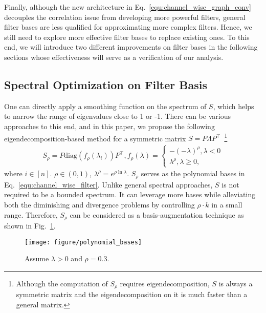 \documentclass[nohyperref]{article}
\theoremstyle{plain}
\theoremstyle{definition}
\theoremstyle{remark}
\begin{document}
Finally, although the new architecture in Eq.~\ref{equ:channel_wise_graph_conv} decouples the correlation issue from developing more powerful filters, general filter bases are less qualified for approximating more complex filters. Hence, we still need to explore more effective filter bases to replace existing ones. To this end, we will introduce two different improvements on filter bases in the following sections whose effectiveness will serve as a verification of our analysis.


\subsection{Spectral Optimization on Filter Basis}
\label{sec:basis_optim}

One can directly apply a smoothing function on the spectrum of $S$, which helps to narrow the range of eigenvalues close to 1 or -1.
There can be various approaches to this end, and in this paper, we propose the following eigendecomposition-based method for a symmetric matrix $S=P\Lambda P^{\top}$~\footnote{Although the computation of $S_{\rho}$ requires eigendecomposition, $S$ is always a symmetric matrix and the eigendecomposition on it is much faster than a general matrix.}
\begin{equation}
	\label{equ:basis_optim}
	\begin{aligned}
		S_{\rho}=P\mathrm{diag}(f_{\rho}(\lambda_i))P^{\top},
		f_{\rho}(\lambda)=
		\left\{
		\begin{array}{ll}
			-(-\lambda)^{\rho}, \lambda<0 \\
			\lambda^{\rho}, \lambda\geq0,
		\end{array}
		\right.
	\end{aligned}
\end{equation}
where $i\in[n]$.
$\rho\in(0, 1)$, $\lambda^{\rho}=e^{\rho\ln\lambda}$.
$S_{\rho}$ serves as the polynomial bases in Eq.~\ref{equ:channel_wise_filter}.
Unlike general spectral approaches, $S$ is not required to be a bounded spectrum.
It can leverage more bases while alleviating both the diminishing and divergence problems by controlling $\rho\cdot k$ in a small range.
Therefore, $S_{\rho}$ can be considered as a basis-augmentation technique as shown in Fig.~\ref{fig:basis_optim}.
\begin{figure}[ht]
	\centering
	\texttt{[image: figure/polynomial\_bases]}
	\vspace{-5pt}
	\caption{Assume $\lambda>0$ and $\rho=0.\dot 3$.}
	\label{fig:basis_optim}
	\vspace{-10pt}
\end{figure}
\end{document}
